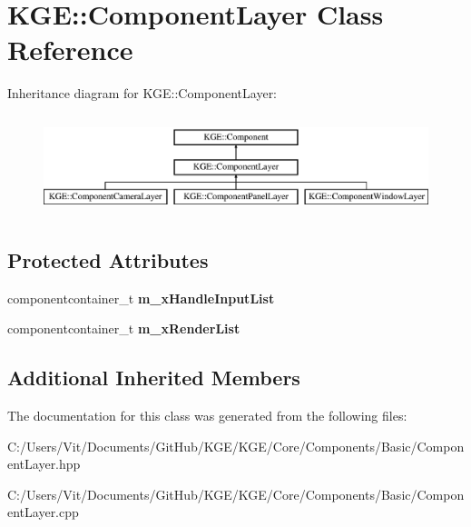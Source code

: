 \hypertarget{class_k_g_e_1_1_component_layer}{\section{K\-G\-E\-:\-:Component\-Layer Class Reference}
\label{class_k_g_e_1_1_component_layer}
}
Inheritance diagram for K\-G\-E\-:\-:Component\-Layer\-:\begin{figure}[H]
\begin{center}
\leavevmode
\includegraphics[height=2.931937cm]{class_k_g_e_1_1_component_layer}
\end{center}
\end{figure}
\subsection*{Protected Attributes}
\begin{DoxyCompactItemize}
\item 
\hypertarget{class_k_g_e_1_1_component_layer_a8e4c60d1b64f97420621fe5e108683d0}{componentcontainer\-\_\-t {\bfseries m\-\_\-x\-Handle\-Input\-List}}\label{class_k_g_e_1_1_component_layer_a8e4c60d1b64f97420621fe5e108683d0}

\item 
\hypertarget{class_k_g_e_1_1_component_layer_aa2d8c0ddbd70e762e2168438237c58b1}{componentcontainer\-\_\-t {\bfseries m\-\_\-x\-Render\-List}}\label{class_k_g_e_1_1_component_layer_aa2d8c0ddbd70e762e2168438237c58b1}

\end{DoxyCompactItemize}
\subsection*{Additional Inherited Members}


The documentation for this class was generated from the following files\-:\begin{DoxyCompactItemize}
\item 
C\-:/\-Users/\-Vit/\-Documents/\-Git\-Hub/\-K\-G\-E/\-K\-G\-E/\-Core/\-Components/\-Basic/Component\-Layer.\-hpp\item 
C\-:/\-Users/\-Vit/\-Documents/\-Git\-Hub/\-K\-G\-E/\-K\-G\-E/\-Core/\-Components/\-Basic/Component\-Layer.\-cpp\end{DoxyCompactItemize}
